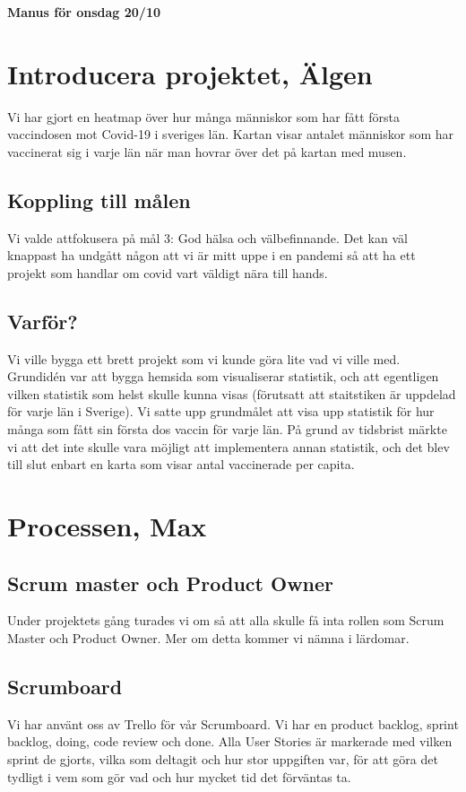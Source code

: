 \documentclass[]{article}
\begin{document}
\textbf{\huge{Manus för onsdag 20/10}}

\section{Introducera projektet, \textbf{Älgen}}
Vi har gjort en heatmap över hur många människor som har fått första vaccindosen mot Covid-19 i sveriges län.
Kartan visar antalet människor som har vaccinerat sig i varje län när man hovrar över det på kartan med musen.

\subsection{Koppling till målen}
Vi valde attfokusera på mål 3: God hälsa och välbefinnande. Det kan väl knappast ha undgått någon att vi är mitt uppe i en pandemi så att ha ett projekt som handlar om covid vart väldigt nära till hands. 

\subsection{Varför?}
Vi ville bygga ett brett projekt som vi kunde göra lite vad vi ville med. Grundidén var att bygga hemsida som visualiserar statistik, och att egentligen vilken statistik som helst skulle kunna visas (förutsatt att staitstiken är uppdelad för varje län i Sverige). Vi satte upp grundmålet att visa upp statistik för hur många som fått sin första dos vaccin för varje län. På grund av tidsbrist märkte vi att det inte skulle vara möjligt att implementera annan statistik, och det blev till slut enbart en karta som visar antal vaccinerade per capita.


\section{Processen, \textbf{Max}}
\subsection{Scrum master och Product Owner}
Under projektets gång turades vi om så att alla skulle få inta rollen som Scrum Master och Product Owner. Mer om detta kommer vi nämna i lärdomar.

\subsection{Scrumboard}
Vi har använt oss av Trello för vår Scrumboard. Vi har en product backlog, sprint backlog, doing, code review och done. Alla User Stories är markerade med vilken sprint de gjorts, vilka som deltagit och hur stor uppgiften var, för att göra det tydligt i vem som gör vad och hur mycket tid det förväntas ta.
\end{document}
